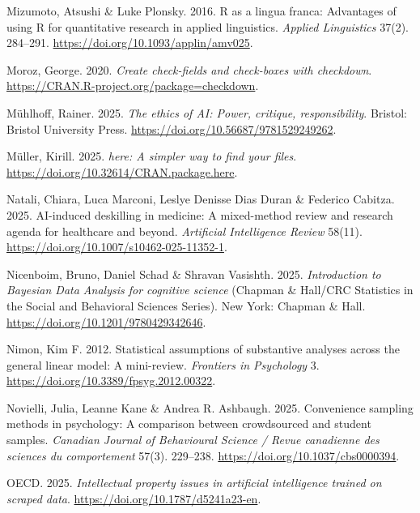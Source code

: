 \documentclass[
  letterpaper,
  DIV=11,
  numbers=noendperiod]{scrreprt}
\newlength{\cslhangindent}
\newenvironment{CSLReferences}[2] %
 {\begin{list}{}{%
  \setlength{\itemindent}{0pt}
  \setlength{\leftmargin}{0pt}
  \setlength{\parsep}{0pt}
  \ifodd #1
   \setlength{\leftmargin}{\cslhangindent}
   \setlength{\itemindent}{-1\cslhangindent}
  \fi
  \setlength{\itemsep}{#2\baselineskip}}}
 {\end{list}}
\begin{document}
\begin{CSLReferences}{1}{0}
Mizumoto, Atsushi \& Luke Plonsky. 2016. R as a lingua franca:
Advantages of using {R} for quantitative research in applied
linguistics. \emph{Applied Linguistics} 37(2). 284--291.
\url{https://doi.org/10.1093/applin/amv025}.

Moroz, George. 2020. \emph{Create check-fields and check-boxes with
checkdown}. \url{https://CRAN.R-project.org/package=checkdown}.

Mühlhoff, Rainer. 2025. \emph{The ethics of AI: Power, critique,
responsibility}. Bristol: Bristol University Press.
\url{https://doi.org/10.56687/9781529249262}.

Müller, Kirill. 2025. \emph{{here}: A simpler way to find your files}.
\url{https://doi.org/10.32614/CRAN.package.here}.

Natali, Chiara, Luca Marconi, Leslye Denisse Dias Duran \& Federico
Cabitza. 2025. AI-induced deskilling in medicine: A mixed-method review
and research agenda for healthcare and beyond. \emph{Artificial
Intelligence Review} 58(11).
\url{https://doi.org/10.1007/s10462-025-11352-1}.

Nicenboim, Bruno, Daniel Schad \& Shravan Vasishth. 2025.
\emph{Introduction to Bayesian Data Analysis for cognitive science}
(Chapman \& Hall/CRC Statistics in the Social and Behavioral Sciences
Series). New York: Chapman \& Hall.
\url{https://doi.org/10.1201/9780429342646}.

Nimon, Kim F. 2012. Statistical assumptions of substantive analyses
across the general linear model: A mini-review. \emph{Frontiers in
Psychology} 3. \url{https://doi.org/10.3389/fpsyg.2012.00322}.

Novielli, Julia, Leanne Kane \& Andrea R. Ashbaugh. 2025. Convenience
sampling methods in psychology: A comparison between crowdsourced and
student samples. \emph{Canadian Journal of Behavioural Science / Revue
canadienne des sciences du comportement} 57(3). 229--238.
\url{https://doi.org/10.1037/cbs0000394}.

OECD. 2025. \emph{Intellectual property issues in artificial
intelligence trained on scraped data}.
\url{https://doi.org/10.1787/d5241a23-en}.


\end{CSLReferences}
\end{document}
